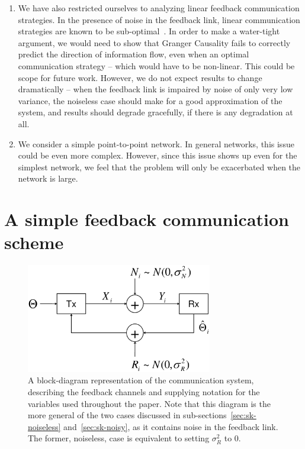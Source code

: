 \documentclass[letterpaper, 10pt, conference]{ieeeconf}
\begin{document}
\begin{enumerate}
	\item We have also restricted ourselves to analyzing linear feedback communication strategies. In the presence of noise in the feedback link, linear communication strategies are known to be sub-optimal~\cite{YoungHanKimPaper}. In order to make a water-tight argument, we would need to show that Granger Causality fails to correctly predict the direction of information flow, even when an optimal communication strategy -- which would have to be non-linear. This could be scope for future work. However, we do not expect results to change dramatically -- when the feedback link is impaired by noise of only very low variance, the noiseless case should make for a good approximation of the system, and results should degrade gracefully, if there is any degradation at all.
	\item We consider a simple point-to-point network. In general networks, this issue could be even more complex. However, since this issue shows up even for the simplest network, we feel that the problem will only be exacerbated when the network is large.
\end{enumerate}



\section{A simple feedback communication scheme}
\label{sec:sk}

\begin{figure}[htbp] %
	\centering
	\includegraphics[width=3.2in]{sk-block-diagram}
	\caption{A block-diagram representation of the communication system, describing the feedback channels and supplying notation for the variables used throughout the paper. Note that this diagram is the more general of the two cases discussed in sub-sections~\ref{sec:sk-noiseless} and~\ref{sec:sk-noisy}, as it contains noise in the feedback link. The former, noiseless, case is equivalent to setting $\sigma_R^2$ to 0.}
	\label{fig:sk-block-diagram}
\end{figure}
\end{document}
